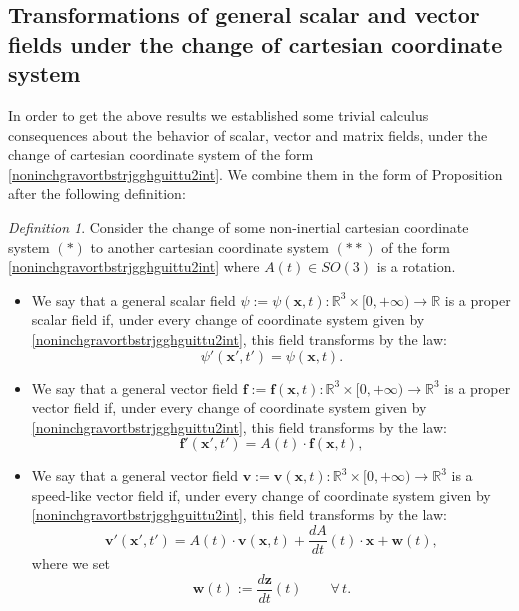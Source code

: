 \documentclass{article}
\theoremstyle{definition}
\newtheorem{definition}{Definition}[section]
\theoremstyle{remark}
\renewcommand{\vec}[1]{\mathbf{#1}}
\newcommand{\R}{\mathbb{R}}
\newcommand{\er}{\eqref}
\newcommand{\R}{{\mathbb{R}}}
\newcommand{\er}{\eqref}
\newtheorem{definition}{Definition}
\begin{document}
\subsection{Transformations of general scalar and vector fields under the
change of cartesian coordinate system} In order to get the above
results we established some trivial calculus consequences about the
behavior of scalar, vector and matrix fields, under the change of
cartesian coordinate system of the form
\er{noninchgravortbstrjgghguittu2int}. We combine them in the form
of Proposition after the following definition:
\begin{definition}\label{bggghghgjint}
Consider the change of some non-inertial cartesian coordinate system
$(*)$ to another cartesian coordinate system $(**)$ of the form
\er{noninchgravortbstrjgghguittu2int} where $A(t)\in SO(3)$ is a
rotation.
\begin{itemize}
\item
We say that a general scalar field $\psi:=\psi(\vec
x,t):\R^3\times[0,+\infty)\to\R$ is a proper scalar field if, under
every change of coordinate system given by
\er{noninchgravortbstrjgghguittu2int}, this field transforms by the
law:
\begin{equation}\label{uguyytfddddint}
\psi'(\vec x',t')=\psi(\vec x,t).
\end{equation}

\item
We say that a general vector field $\vec f:=\vec f(\vec
x,t):\R^3\times[0,+\infty)\to\R^3$ is a proper vector field if,
under every change of coordinate system given by
\er{noninchgravortbstrjgghguittu2int}, this field transforms by the
law:
\begin{equation}\label{uguyytfddddgghjjgint}
\vec f'(\vec x',t')=A(t)\cdot\vec f(\vec x,t),
\end{equation}


\item
We say that a general vector field $\vec v:=\vec v(\vec
x,t):\R^3\times[0,+\infty)\to\R^3$ is a speed-like vector field if,
under every change of coordinate system given by
\er{noninchgravortbstrjgghguittu2int}, this field transforms by the
law:
\begin{equation}
\label{NoIn5redbstrint}\vec v'(\vec x',t')=A(t)\cdot \vec v(\vec
x,t)+
\frac{d A}{dt}(t)\cdot\vec x+
\vec w(t),
\end{equation}
where we set
\begin{equation}\label{buitguihjkint}
\vec w(t):=\frac{d\vec z}{dt}(t)\quad\quad\forall\,t.
\end{equation}


\end{itemize}
\end{definition}
\end{document}
